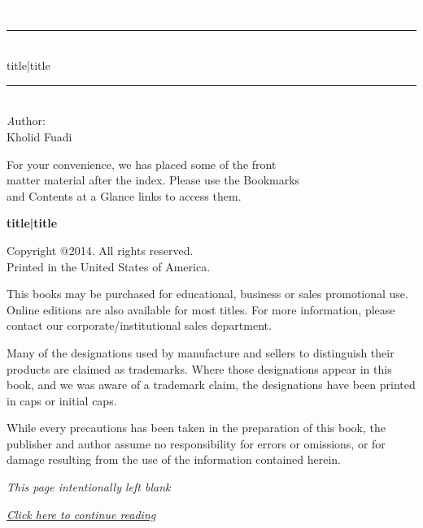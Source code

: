 \documentclass{book}
\newcommand{\HRule}{\rule{\linewidth}{2mm}}
\begin{document}
\begin{titlepage}

\begin{flushright}
\textcolor{white}{hidden text}

\vspace{7cm}

\HRule \\[0.4cm]
{\large {{ title|title }} }\\[0.4cm]
\HRule \\[1.5cm]

\large{\emph Author:}\\
\small{ Kholid Fuadi }

\end{flushright}

\vfill

\begin{flushright}
\footnotesize{ For your convenience, we has placed some of the front \\
matter material after the index. Please use the Bookmarks \\
and Contents at a Glance links to access them. }
\end{flushright}

\end{titlepage}
\noindent
{\textbf {\footnotesize {{ title|title }} }}

\vspace{6pt}

\noindent
\scriptsize{Copyright @2014. All rights reserved. \\Printed in the United
  States of America.}

\noindent
\scriptsize{This books may be purchased for educational, business or
  sales promotional use. Online editions are also available for most
  titles. For more information, please contact our
  corporate/institutional sales department.}

\vfill

\noindent
\scriptsize{Many of the designations used by manufacture and sellers
  to distinguish their products are claimed as trademarks. Where those
  designations appear in this book, and we was aware of a trademark
  claim, the designations have been printed in caps or initial caps.}

\noindent
\scriptsize{While every precautions has been taken in the preparation of
  this book, the publisher and author assume no responsibility for
  errors or omissions, or for damage resulting from the use of the
  information contained herein.}

\clearpage

\noindent
\begin{center}
{\normalsize \emph{This page intentionally left blank}}
\end{center}

\clearpage

\noindent
\emph{\large{\href{http://www.google.com}{Click here to continue reading}}}
\end{document}
